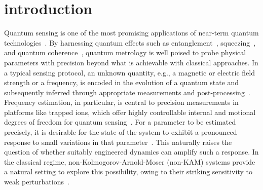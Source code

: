 \documentclass[amsmath,nobibnotes,aps,amssymb,pra, prl,aps,showpacs,superscriptaddress,twocolumn, longbibliography, reprint]{revtex4-2}
\begin{document}
\section{introduction}
\label{section-1}


Quantum sensing is one of the most promising applications of near-term quantum technologies~\cite{rosi2014precision, degen2017quantum, RevModPhys.90.035005, DeMille2024QuantumSensing}. By harnessing quantum effects such as entanglement~\cite{giovannetti2004quantum, giovannetti2006quantum}, squeezing~\cite{PhysRevD.23.1693}, and quantum coherence~\cite{RevModPhys.89.041003}, quantum metrology is well poised to probe physical parameters with precision beyond what is achievable with classical approaches. In a typical sensing protocol, an unknown quantity, e.g., a magnetic or electric field strength or a frequency, is encoded in the evolution of a quantum state and subsequently inferred through appropriate measurements and post-processing~\cite{degen2017quantum}. Frequency estimation, in particular, is central to precision measurements in platforms like trapped ions, which offer highly controllable internal and motional degrees of freedom for quantum sensing~\cite{PhysRevLett.110.163604, Wolf2019, PRXQuantum.5.020314, PhysRevX.14.031030}. For a parameter to be estimated precisely, it is desirable for the state of the system to exhibit a pronounced response to small variations in that parameter~\cite{braunstein1994statistical}. This naturally raises the question of whether suitably engineered dynamics can amplify such a response. In the classical regime, non-Kolmogorov-Arnold-Moser (non-KAM) systems provide a natural setting to explore this possibility, owing to their striking sensitivity to weak perturbations~\cite{sankaranarayanan2001chaos, sankaranarayanan2001quantum, varikuti2023probing, varikuti2026instabilities, sreeram2025information, varikuti2024quantum}.
\end{document}
